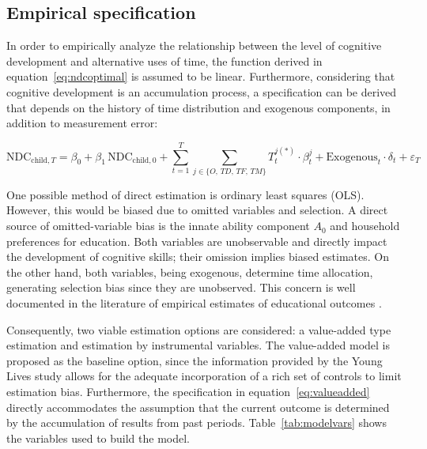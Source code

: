 \documentclass[12pt]{article}
\newcommand{\NDC}{\mathrm{NDC}}
\newcommand{\child}{\text{child}}
\begin{document}
\subsection{Empirical specification}
\label{subsec:empirical}

In order to empirically analyze the relationship between the level of cognitive
development and alternative uses of time, the function derived in
equation~\eqref{eq:ndcoptimal} is assumed to be linear. Furthermore,
considering that cognitive development is an accumulation process, a
specification can be derived that depends on the history of time distribution
and exogenous components, in addition to measurement error:

\begin{equation}
  \NDC_{\child,T} = \beta_0 + \beta_1\,\NDC_{\child,0}
    + \sum_{t=1}^{T} \sum_{j \in \{O,\,TD,\,TF,\,TM\}}
      T_{t}^{j(*)} \cdot \beta_{t}^{j}
    + \mathrm{Exogenous}_{t} \cdot \delta_{t}
    + \varepsilon_{T}
  \label{eq:valueadded}
\end{equation}

One possible method of direct estimation is ordinary least squares (OLS).
However, this would be biased due to omitted variables and selection. A direct
source of omitted-variable bias is the innate ability component $A_0$ and
household preferences for education. Both variables are unobservable and
directly impact the development of cognitive skills; their omission implies
biased estimates. On the other hand, both variables, being exogenous,
determine time allocation, generating selection bias since they are unobserved.
This concern is well documented in the literature of empirical estimates of
educational outcomes \citep{glewwe2020, webbink2005}.

Consequently, two viable estimation options are considered: a value-added type
estimation and estimation by instrumental variables. The value-added model is
proposed as the baseline option, since the information provided by the Young
Lives study allows for the adequate incorporation of a rich set of controls to
limit estimation bias. Furthermore, the specification in
equation~\eqref{eq:valueadded} directly accommodates the assumption that the
current outcome is determined by the accumulation of results from past periods.
Table~\ref{tab:modelvars} shows the variables used to build the model.
\end{document}
